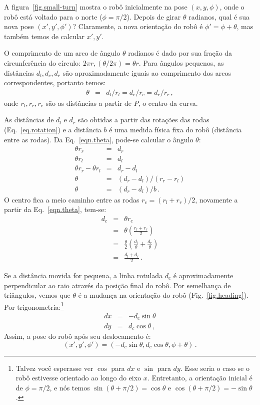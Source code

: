 A figura~\ref{fig.small-turn} mostra o robô inicialmente na pose $(x,y,\phi)$, onde o robô está voltado para o norte ($\phi=\pi/2$). Depois de girar $\theta$ radianos, qual é sua nova pose $(x',y',\phi')$? Claramente, a nova orientação do robô é $\phi'=\phi+\theta$, mas também temos de calcular $x',y'$.

O comprimento de um arco de ângulo $\theta$ radianos é dado por sua fração da circunferência do círculo: $2\pi r,(\theta/2\pi)=\theta r$. Para ângulos pequenos, as distâncias $d_l,d_c,d_r$ são aproximadamente iguais ao comprimento dos arcos correspondentes, portanto temos:
\begin{eqnarray}
\theta &=& d_l/r_l = d_c/r_c = d_r/r_r\,,\label{eqn.theta}
\end{eqnarray}
onde $r_l, r_r, r_c$ são as distâncias a partir de $P$, o centro da curva.

As distâncias de $d_l$ e $d_r$ são obtidas a partir das rotações das rodas (Eq.~\ref{eq.rotation}) e a distância $b$ é uma medida física fixa do robô (distância entre as rodas). Da Eq.~\ref{eqn.theta}, pode-se calcular o ângulo $\theta$:
\begin{eqnarray*}
\theta r_r &=& d_r\\
\theta r_l &=& d_l\\
\theta r_r - \theta r_l &=& d_r - d_l\\
\theta &=& (d_r - d_l) / (r_r - r_l)\\
\theta &=& (d_r - d_l) / b\,.
\end{eqnarray*}
O centro fica a meio caminho entre as rodas $r_c =(r_l+r_r)/2$,
novamente a partir da Eq.~\ref{eqn.theta}, tem-se:
\begin{eqnarray*}
d_c&=&\theta r_c\\
&=&\theta \left(\frac{r_l+r_r}{2}\right)\\
&=&\frac{\theta}{2} \left(\frac{d_l}{\theta} + \frac{d_r}{\theta}\right)\\
&=&\frac{d_l+d_r}{2}\,.
\end{eqnarray*}

Se a distância movida for pequena, a linha rotulada $d_c$ é aproximadamente
perpendicular ao raio através da posição final do robô. Por semelhança de triângulos, vemos que $\theta$ é a mudança na orientação do robô (Fig.~\ref{fig.heading}). Por trigonometria:\footnote{Talvez você esperasse ver $\cos$ para $dx$ e $\sin$ para $dy$. Esse seria o caso se o robô estivesse orientado ao longo do eixo $x$. Entretanto, a orientação inicial é de $\phi=\pi/2$, e nós temos $\sin(\theta+\pi/2)=\cos\theta$ e $\cos(\theta+\pi/2)=-\sin\theta$.}
\begin{eqnarray*}
\textit{dx} &=& - d_c \sin \theta\\
\textit{dy} &=& d_c \cos \theta\,,
\end{eqnarray*}
Assim, a pose do robô após seu deslocamento é:
\[
(x',y',\phi') = ( - d_c \sin \theta, d_c \cos \theta, \phi+\theta)\,.
\]

